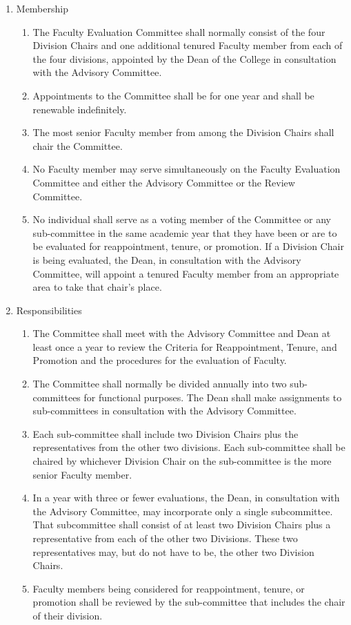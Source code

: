 \documentclass{manual}
\newcommand{\itemLevelA}{\alph*.}
\newcommand{\itemLevelB}{\arabic*)}
\newcommand{\itemRefA}{\alph*}
\newcommand{\itemRefB}{\arabic*}
\begin{document}
	\begin{enumerate}[label=\itemLevelA,ref=\itemRefA]
	\item Membership

		\begin{enumerate}[label=\itemLevelB,ref=\itemRefB]
		\item The Faculty Evaluation Committee shall normally consist of the four Division Chairs and one additional tenured Faculty member from each of the four divisions, appointed by the Dean of the College in consultation with the Advisory Committee.
		\item Appointments to the Committee shall be for one year and shall be renewable indefinitely.
		\item The most senior Faculty member from among the Division Chairs shall chair the Committee.
		\item No Faculty member may serve simultaneously on the Faculty Evaluation Committee and either the Advisory Committee or the Review Committee.
		\item No individual shall serve as a voting member of the Committee or any sub-committee in the same academic year that they have  been or are to be evaluated for reappointment, tenure, or promotion. If a Division Chair is being evaluated, the Dean, in consultation with the Advisory Committee, will appoint a tenured Faculty member from an appropriate area to take that chair's place.
		\end{enumerate}
	
	\item Responsibilities

		\begin{enumerate}[label=\itemLevelB,ref=\itemRefB]
		\item The Committee shall meet with the Advisory Committee and Dean at least once a year to review the Criteria for Reappointment, Tenure, and Promotion and the procedures for the evaluation of Faculty.
		\item The Committee shall normally be divided annually into two sub-committees for functional purposes. The Dean shall make assignments to sub-committees in consultation with the Advisory Committee.
		\item Each sub-committee shall include two Division Chairs plus the representatives from the other two divisions. Each sub-committee shall be chaired by whichever Division Chair on the sub-committee is the more senior Faculty member.
		\item In a year with three or fewer evaluations, the Dean, in consultation with the Advisory Committee, may incorporate only a single subcommittee. That subcommittee shall consist of at least two Division Chairs plus a representative from each of the other two Divisions. These two representatives may, but do not have to be, the other two Division Chairs.
		\item Faculty members being considered for reappointment, tenure, or promotion shall be reviewed by the sub-committee that includes the chair of their division.
		\end{enumerate}
	

\end{enumerate}
\end{document}
